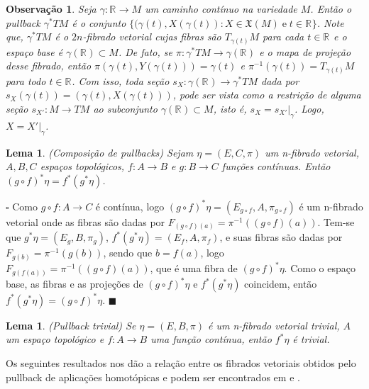 \documentclass[12pt]{book}
\newtheorem{lema}[teorema]{Lema}
\newtheorem{observacao}[teorema]{Observação}
\newenvironment{prova}[1]{$\square$ #1}{\hfill$\blacksquare$}
\newcommand{\campossuaves}[1]{\mathfrak{X}(#1)}
\newcommand{\espacotangenteponto}[2]{T_{#1}#2}
\newcommand{\pullbackfibradotangente}[2]{#1^{*}T#2}
\newcommand{\pullbackfibradotangenteM}[1]{\pullbackfibradotangente{#1}{M}}
\newcommand{\real}[1]{\mathbb{R}^{#1}}
\newcommand{\reta}{\real{}}
\begin{document}
	\begin{observacao}\label{observacao_pullback_fibrado_tangente}
		Seja $\gamma:\reta \to M$ um caminho contínuo na variedade $M$. Então o pullback $\pullbackfibradotangenteM{\gamma}$ é o conjunto $\{(\gamma(t), X(\gamma(t)): X\in \campossuaves{M} \; \text{e}\; t \in \reta \}$. Note que, $\pullbackfibradotangenteM{\gamma}$ é o $2n$-fibrado vetorial cujas fibras são $\espacotangenteponto{\gamma(t)}{M}$ para cada $t\in \reta$ e o espaço base é $\gamma(\reta)\subset M$. De fato, se $\pi: \pullbackfibradotangenteM{\gamma} \to \gamma(\reta)$ e o mapa de projeção desse fibrado, então $\pi(\gamma(t), Y(\gamma(t))) = \gamma(t)$ e $\pi^{-1}(\gamma(t)) = \espacotangenteponto{\gamma(t)}{M}$ para todo $t\in \reta$. Com isso, toda seção $s_{X}: \gamma(\reta)\to \pullbackfibradotangenteM{\gamma}$ dada por $s_{X}(\gamma(t)) = (\gamma(t), X(\gamma(t)))$, pode ser vista como a restrição de alguma seção $s_{X'}: M\to TM$ ao subconjunto $\gamma(\reta) \subset M$, isto é, $s_{X}= s_{X'}|_{\gamma}$. Logo, $X=X'|_{\gamma}$.
	\end{observacao}
	
	\begin{lema}\label{pullback_composicao}
		(Composição de pullbacks) Sejam $\eta =(E, C, \pi)$ um n-fibrado vetorial, $A, B, C$ espaços topológicos, $f:A\to B$ e $g:B\to C$ funções contínuas. Então $(g\circ f)^{*} \eta= f^{*}(g^{*}\eta)$.
	\end{lema}
	\begin{prova}
		Como $g\circ f:A\to C$ é contínua, logo $(g\circ f)^{*}\eta = (E_{g\circ f}, A, \pi_{g\circ f})$ é um n-fibrado vetorial onde as fibras são dadas por $F_{(g\circ f)(a)} = \pi^{-1}((g\circ f)(a))$. Tem-se que $g^{*}\eta=(E_{g}, B, \pi_{g})$, $f^{*}(g^{*}\eta) = (E_{f}, A, \pi_{f})$, e suas fibras são dadas por $F_{g(b)} = \pi^{-1}(g(b))$, sendo que $b=f(a)$, logo  $F_{g(f(a))} = \pi^{-1}((g \circ f)(a))$, que é uma fibra de $(g\circ f)^{*}\eta$. Como o espaço base, as fibras e as projeções de $(g\circ f)^{*}\eta$ e $f^{*}(g^{*}\eta)$ coincidem, então $f^{*}(g^{*}\eta) = (g\circ f)^{*}\eta$.
	\end{prova}
	\begin{lema}\label{pullback_trivial}
		(Pullback trivial) Se $\eta = (E, B, \pi)$ é um n-fibrado vetorial trivial, $A$ um espaço topológico e $f:A\to B$ uma função contínua, então $f^{*}\eta$ é trivial.
	\end{lema}
	
	Os seguintes resultados nos dão a relação entre os fibrados vetoriais obtidos pelo pullback de aplicações homotópicas e podem ser encontrados em \cite{nakahara} e \cite{steenrod_fibre_bundles}.
	
\end{document}
